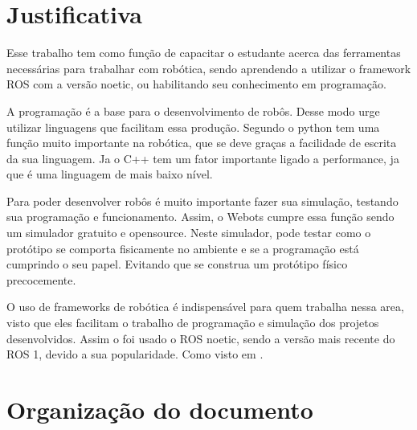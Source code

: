 

\section{Justificativa}
\label{sec:justi}


Esse trabalho tem como função de capacitar o estudante acerca das ferramentas necessárias para trabalhar com robótica, sendo aprendendo a utilizar o framework ROS com a versão noetic, ou habilitando seu conhecimento em programação.

A programação é a base para o desenvolvimento de robôs. Desse modo urge utilizar linguagens que facilitam essa produção. Segundo \cite{WhenToUs14:online} o python tem uma função muito importante na robótica, que se deve graças a facilidade de escrita da sua linguagem. Ja o C++ tem um fator importante ligado a performance, ja que é uma linguagem de mais baixo nível.

Para poder desenvolver robôs é muito importante fazer sua simulação, testando sua programação e funcionamento. Assim, o Webots cumpre essa função sendo um simulador gratuito e opensource. Neste simulador, pode testar como o protótipo se comporta fisicamente no ambiente e se a programação está cumprindo o seu papel. Evitando que se construa um protótipo físico precocemente.

O uso de frameworks de robótica é indispensável para quem trabalha nessa area, visto que eles facilitam o trabalho de programação e simulação dos projetos desenvolvidos. Assim o foi usado o ROS noetic, sendo a versão mais recente do ROS 1, devido a sua popularidade. Como visto em \cite{ROSWhyRO33:online}.


\section{Organização do documento}
\label{section:organizacao}

